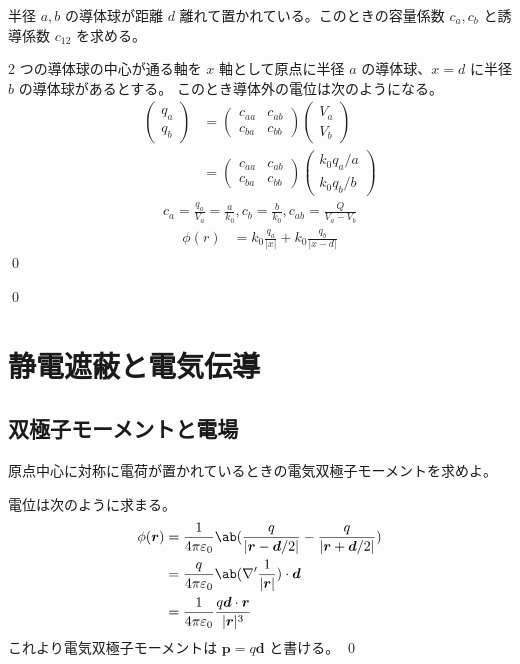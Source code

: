 \documentclass[uplatex,dvipdfmx,a4paper,11pt]{jlreq}
\makeatletter
\newcommand{\rr}{\bm{r}}
\newcommand{\pp}{\bm{p}}
\newcommand{\vnabla}{\mathbf{\nabla}}
\newcommand\mqty[1]{\begin{pmatrix}#1\end{pmatrix}}
\theoremstyle{definition}
\renewenvironment{proof}[1][\proofname]{\par
  \normalfont
  \topsep6\p@\@plus6\p@ \trivlist
  \item[\hskip\labelsep{\bfseries #1}\@addpunct{\bfseries}]\ignorespaces\quad\par
}{%
  \qed\endtrivlist\@endpefalse
}
\renewcommand\proofname{証明}
\makeatother
\begin{document}
\begin{problem}
半径 $a, b$ の導体球が距離 $d$ 離れて置かれている。このときの容量係数 $c_a, c_b$ と誘導係数 $c_{12}$ を求める。
\end{problem}
\begin{proof}
  2 つの導体球の中心が通る軸を $x$ 軸として原点に半径 $a$ の導体球、$x = d$ に半径 $b$ の導体球があるとする。
  このとき導体外の電位は次のようになる。
  \begin{align}
    \mqty{q_a                  \\ q_b} & = \mqty{c_{aa} & c_{ab} \\ c_{ba} & c_{bb}}\mqty{V_a \\ V_b} \\
     & = \mqty{c_{aa} & c_{ab} \\ c_{ba} & c_{bb}}\mqty{k_0q_a/a \\ k_0q_b/b}
  \end{align}
  \begin{align}
    c_a = \frac{q_a}{V_a} = \frac{a}{k_0}, c_b = \frac{b}{k_0}, c_{ab} = \frac{Q}{V_a - V_b}
  \end{align}
  \begin{align}
    \phi(r) & = k_0\frac{q_a}{|x|} + k_0\frac{q_b}{|x - d|}
  \end{align}
\end{proof}

\begin{problem}
\end{problem}
\begin{proof}

\end{proof}

\section{静電遮蔽と電気伝導}
\subsection{双極子モーメントと電場}
\begin{problem}
原点中心に対称に電荷が置かれているときの電気双極子モーメントを求めよ。
\end{problem}
\begin{proof}
  電位は次のように求まる。
  \begin{align}
    \phi(\rr) & = \frac{1}{4\pi\varepsilon_0}\ab(\frac{q}{|\rr - \bm{d}/2|} - \frac{q}{|\rr + \bm{d}/2|}) \\
              & = \frac{q}{4\pi\varepsilon_0}\ab(\vnabla'\frac{1}{|\rr|})\cdot\bm{d}                      \\
              & = \frac{1}{4\pi\varepsilon_0}\frac{q\bm{d}\cdot\rr}{|\rr|^3}
  \end{align}
  これより電気双極子モーメントは $\pp = q\bm{d}$ と書ける。
\end{proof}
\end{document}
